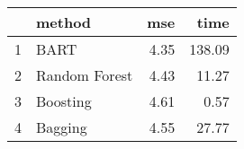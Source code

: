 \begin{table}[ht]
\centering
\begin{tabular}{rlrr}
  \hline
 & method & mse & time \\ 
  \hline
1 & BART & 4.35 & 138.09 \\ 
  2 & Random Forest & 4.43 & 11.27 \\ 
  3 & Boosting & 4.61 & 0.57 \\ 
  4 & Bagging & 4.55 & 27.77 \\ 
   \hline
\end{tabular}
\end{table}
